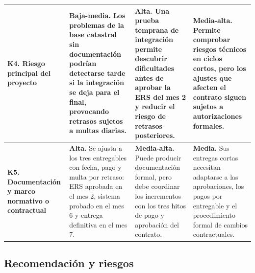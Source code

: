 \documentclass[12pt,a4paper]{article}
\renewcommand{\arraystretch}{1.3}
\begin{document}
\begin{longtable}{
>{\raggedright\arraybackslash}p{2.2cm}
>{\raggedright\arraybackslash}p{3.8cm}
>{\raggedright\arraybackslash}p{3.8cm}
>{\raggedright\arraybackslash}p{3.8cm}
}
\textbf{K4. Riesgo principal del proyecto} &
\textbf{Baja-media.} Los problemas de la base catastral sin documentación podrían detectarse tarde si la integración se deja para el final, provocando retrasos sujetos a multas diarias. &
\textbf{Alta.} Una prueba temprana de integración permite descubrir dificultades antes de aprobar la ERS del mes 2 y reducir el riesgo de retrasos posteriores. &
\textbf{Media-alta.} Permite comprobar riesgos técnicos en ciclos cortos, pero los ajustes que afecten el contrato siguen sujetos a autorizaciones formales. \\
\midrule

\textbf{K5. Documentación y marco normativo o contractual} &
\textbf{Alta.} Se ajusta a los tres entregables con fecha, pago y multa por retraso: ERS aprobada en el mes 2, sistema probado en el mes 6 y entrega definitiva en el mes 7. &
\textbf{Media-alta.} Puede producir documentación formal, pero debe coordinar los incrementos con los tres hitos de pago y aprobación del contrato. &
\textbf{Media.} Sus entregas cortas necesitan adaptarse a las aprobaciones, los pagos por entregable y el procedimiento formal de cambios contractuales. \\

\bottomrule
\end{longtable}
\endgroup

\subsection{Recomendación y riesgos}

\begingroup
\small
\setlength{\tabcolsep}{4pt}
\renewcommand{\arraystretch}{1.15}
\end{document}
